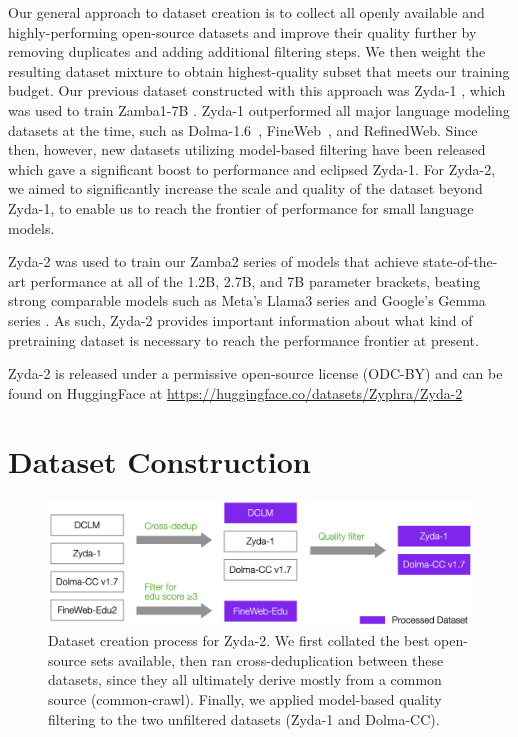 \documentclass[conference]{IEEEtran}
\begin{document}
Our general approach to dataset creation is to collect all openly available and highly-performing open-source datasets and improve their quality further by removing duplicates and adding additional filtering steps. We then weight the resulting dataset mixture to obtain highest-quality subset that meets our training budget. Our previous dataset constructed with this approach was Zyda-1 \citep{tokpanov2024zyda}, which was used to train Zamba1-7B \citep{glorioso2024zamba}. Zyda-1 outperformed all major language modeling datasets at the time, such as Dolma-1.6~\cite{soldaini2024dolma}, FineWeb~\citep{penedo2024fineweb}, and RefinedWeb\citep{penedo2023refinedweb}. Since then, however, new datasets utilizing model-based filtering have been released which gave a significant boost to performance and eclipsed Zyda-1. For Zyda-2, we aimed to significantly increase the scale and quality of the dataset beyond Zyda-1, to enable us to reach the frontier of performance for small language models. 

Zyda-2 was used to train our Zamba2 series of models \citep{glorioso2024zamba2} that achieve state-of-the-art performance at all of the 1.2B, 2.7B, and 7B parameter brackets, beating strong comparable models such as Meta's Llama3 series \citep{llama3} and Google's Gemma series \citep{team2024gemma}. As such, Zyda-2 provides important information about what kind of pretraining dataset is necessary to reach the performance frontier at present.

Zyda-2 is released under a permissive open-source license (ODC-BY) and can be found on HuggingFace at \url{https://huggingface.co/datasets/Zyphra/Zyda-2}


\section{Dataset Construction}

\begin{figure}
    \centering
    \includegraphics[width=0.9\linewidth]{figures/Zyda-2_creation_process.png}
    \caption{Dataset creation process for Zyda-2. We first collated the best open-source sets available, then ran cross-deduplication between these datasets, since they all ultimately derive mostly from a common source (common-crawl). Finally, we applied model-based quality filtering to the two unfiltered datasets (Zyda-1 and Dolma-CC).}
    \label{dataset_construction}
\end{figure}
\end{document}
